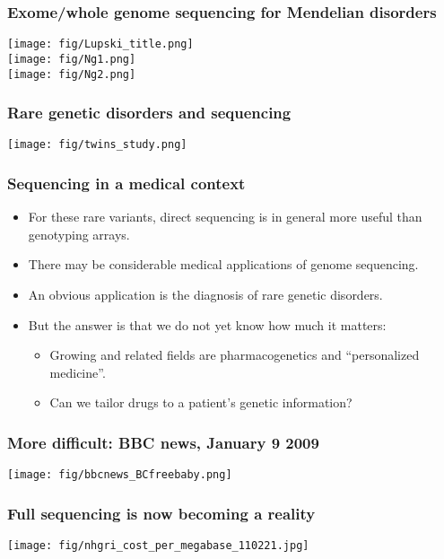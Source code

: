 \documentclass{beamer}
\begin{document}
\begin{frame}
  \frametitle{Exome/whole genome sequencing for Mendelian disorders}
  \begin{center}
    \texttt{[image: fig/Lupski\_title.png]}\\
    \texttt{[image: fig/Ng1.png]}\\
    \texttt{[image: fig/Ng2.png]}
  \end{center}
\end{frame}


\begin{frame}
  \frametitle{Rare genetic disorders and sequencing}
  \begin{center}
    \texttt{[image: fig/twins\_study.png]}
  \end{center}
\end{frame}


\begin{frame}
  \frametitle{Sequencing in a medical context}
  \begin{itemize}
  \item For these rare variants, direct sequencing is in general more useful than genotyping arrays.
  \item There may be considerable medical applications of genome sequencing.
  \item An obvious application is the diagnosis of rare genetic disorders.
  \item But the answer is that we do not yet know how much it matters:
    \begin{itemize}
    \item Growing and related fields are pharmacogenetics and ``personalized medicine''.
    \item Can we tailor drugs to a patient's genetic information?
    \end{itemize}
  \end{itemize}
\end{frame}


\begin{frame}
  \frametitle{More difficult: BBC news, January 9 2009}
  \texttt{[image: fig/bbcnews\_BCfreebaby.png]}
\end{frame}


\begin{frame}
  \frametitle{Full sequencing is now becoming a reality}
  \begin{center}
    \texttt{[image: fig/nhgri\_cost\_per\_megabase\_110221.jpg]}
  \end{center}
\end{frame}
\end{document}
